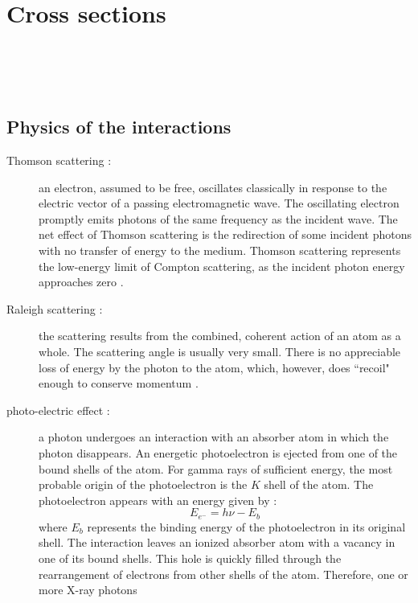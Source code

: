 \section{Cross sections}
\\
\\
\\
\subsection{Physics of the interactions}

\begin{description}
\item [Thomson scattering :] an electron, assumed to be free, oscillates
classically in response to the electric vector of a passing electromagnetic
wave. The oscillating electron promptly emits photons of the same frequency as
the incident wave. The net effect of Thomson scattering is the redirection of
some incident photons with no transfer of energy to the medium. Thomson
scattering represents the low-energy limit of Compton scattering, as the
incident photon energy approaches zero \cite{radiation}.
\item [Raleigh scattering :] the scattering results from the combined,
coherent action of an atom as a whole. The scattering angle is usually very
small. There is no appreciable loss of energy by the photon to the atom,
which, however, does ``recoil" enough to conserve momentum \cite{radiation}.
\item [photo-electric effect :] a photon undergoes an interaction with an
absorber atom in which the photon disappears. An energetic photoelectron is
ejected from one of the bound shells of the atom. For gamma rays of
sufficient energy, the most probable origin of the photoelectron is the $K$
shell of the atom. The photoelectron appears with an energy given by :
\begin{equation}
E_{e^-} = h\nu -E_b
\end{equation}
where $E_b$ represents the binding energy of the photoelectron in its original
shell. The interaction leaves an ionized absorber atom with a vacancy in one
of its bound shells. This hole is quickly filled through the rearrangement of
electrons from other shells of the atom. Therefore, one or more X-ray photons

\end{description}
